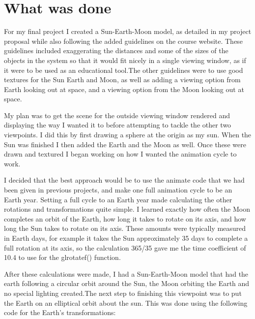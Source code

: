 \documentclass[12pt,serif,draftclsnofoot,onecolumn]{IEEEtran}
\begin{document}
	\section{What was done}
	\par	
			For my final project I created a Sun-Earth-Moon model, as detailed in my project proposal while also following the added guidelines on the course website. These guidelines included exaggerating the distances and some of the sizes of the objects in the system so that it would fit nicely in a single viewing window, as if it were to be used as an educational tool.The other guidelines were to use good textures for the Sun Earth and Moon, as well as adding a viewing option from Earth looking out at space, and a viewing option from the Moon looking out at space.
	\newline
	\par
			My plan was to get the scene for the outside viewing window rendered and displaying the way I wanted it to before attempting to tackle the other two viewpoints. I did this by first drawing a sphere at the origin as my sun. When the Sun was finished I then added the Earth and the Moon as well. Once these were drawn and textured I began working on how I wanted the animation cycle to work.
	\newline
	\par		
			 I decided that the best approach would be to use the animate code that we had been given in previous projects, and make one full animation cycle to be an Earth year. Setting a full cycle to an Earth year made calculating the other rotations and transformations quite simple. I learned exactly how often the Moon completes an orbit of the Earth, how long it takes to rotate on its axis, and how long the Sun takes to rotate on its axis. These amounts were typically measured in Earth days, for example it takes the Sun approximately 35 days to complete a full rotation at its axis, so the calculation 365/35 gave me the time coefficient of 10.4 to use for the glrotatef() function.
	\newline
	\par
			After these calculations were made, I had a Sun-Earth-Moon model that had the earth following a circular orbit around the Sun, the Moon orbiting the Earth and no special lighting created.The next step to finishing this viewpoint was to put the Earth on an elliptical orbit about the sun. This was done using the following code for the Earth's transformations:
	
\end{document}
